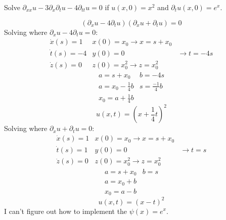 \documentclass[12pt]{exam}
\newcommand{\px}{\partial_x}
\newcommand{\pt}{\partial_t}
\newcommand{\pxx}{\partial_{xx}}
\newcommand{\ptt}{\partial_{tt}}
\begin{document}
\begin{questions}
\newpage 
\begin{question}
Solve $\pxx u - 3\px\pt u - 4\ptt u = 0$ if $u(x,0) = x^2$ and $\pt u(x,0)=e^x$.
\end{question}
\begin{solutionorbox}[\stretch{1}]
\[(\px u - 4\pt u)(\px u + \pt u) = 0\]
Solving where \(\px u - 4\pt u = 0\):
\[
\begin{matrix}
  \Dot{x}(s) = 1 & x(0) = x_0 \rightarrow x = s+x_0&\\
  \Dot{t}(s) = -4 & y(0) = 0 &\rightarrow t = -4s \\
  \Dot{z}(s) = 0 & z(0) = x_0^2 \rightarrow z = x_0^2
\end{matrix}
\]
\[
\begin{matrix}
  a = s + x_0 & b = -4s\\
  a = x_0 - \frac{1}{4}b & s = \frac{-1}{4}b\\
  x_0 = a+\frac{1}{4}b
\end{matrix}
\]
\[u(x,t) = \left(x+\frac{1}{4}t\right)^2\]
Solving where \(\px u + \pt u = 0\):
\[
\begin{matrix}
  \Dot{x}(s) = 1 & x(0) = x_0 \rightarrow x = s+x_0&\\
  \Dot{t}(s) = 1 & y(0) = 0 &\rightarrow t = s \\
  \Dot{z}(s) = 0 & z(0) = x_0^2 \rightarrow z = x_0^2
\end{matrix}
\]
\[
\begin{matrix}
  a = s + x_0 & b = s\\
  a = x_0 + b &\\
  x_0 = a-b
\end{matrix}
\]
\[u(x,t) = (x-t)^2\]
I can't figure out how to implement the \(\psi(x) = e^x\).
\end{solutionorbox}
\end{questions}
\end{document}
